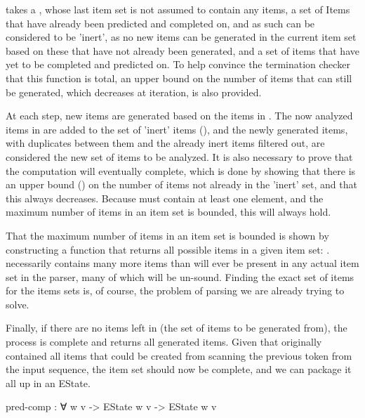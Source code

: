 		 takes a , whose last item set is not
		assumed to contain any items, a set of Items that have already been
		predicted and completed on, and as such can be considered to be
		'inert', as no new items can be generated in the current item set based
		on these that have not already been generated, and a set of items that
		have yet to be completed and predicted on. To help convince the
		termination checker that this function is total, an upper bound on the
		number of items that can still be generated, which decreases at
		iteration, is also provided.

		At each step, new items are generated based on the items in
		. The now analyzed items in  are added to the set
		of 'inert' items (), and the newly generated items, with
		duplicates between them and the already inert items filtered out, are
		considered the new set of items to be analyzed. It is also necessary to
		prove that the computation will eventually complete, which is done by
		showing that there is an upper bound () on the number of
		items not already in the 'inert' set, and that this always decreases.
		Because  must contain at least one element, and the maximum
		number of items in an item set is bounded, this will always hold.

		That the maximum number of items in an item set is bounded is shown by
		constructing a function that returns all possible items in a given item
		set: .  necessarily contains many
		more items than will ever be present in any actual item set in the
		parser, many of which will be un-sound. Finding the exact set of items
		for the items sets is, of course, the problem of parsing we are already
		trying to solve.

		Finally, if there are no items left in  (the set of items to
		be generated from), the process is complete and 
		returns all generated items. Given that  originally
		contained all items that could be created from scanning the previous
		token from the input sequence, the item set should now be complete, and
		we can package it all up in an EState.

		\begin{code}
			  pred-comp : ∀ {w v} ->
			    EState w v -> EState w v
		\end{code}

